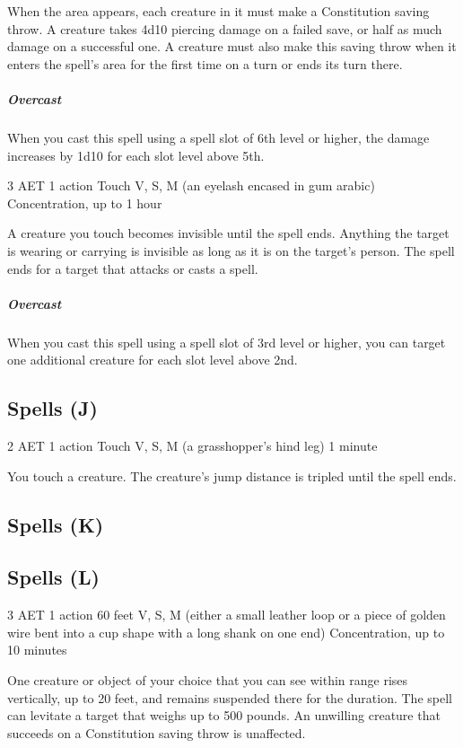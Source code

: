 When the area appears, each creature in it must make a Constitution saving throw. A creature takes 4d10 piercing damage on a failed save, or half as much damage on a successful one. A creature must also make this saving throw when it enters the spell's area for the first time on a turn or ends its turn there.
\subparagraph*{Overcast} When you cast this spell using a spell slot of 6th level or higher, the damage increases by 1d10 for each slot level above 5th.

\label{spell:invisibility}
{3 AET}
{1 action}
{Touch}
{V, S, M (an eyelash encased in gum arabic)}
{Concentration, up to 1 hour}

A creature you touch becomes invisible until the spell ends. Anything the target is wearing or carrying is invisible as long as it is on the target's person. The spell ends for a target that attacks or casts a spell.
\subparagraph*{Overcast} When you cast this spell using a spell slot of 3rd level or higher, you can target one additional creature for each slot level above 2nd.

\subsection{Spells (J)}

\label{spell:jump}
{2 AET}
{1 action}
{Touch}
{V, S, M (a grasshopper's hind leg)}
{1 minute}

You touch a creature. The creature's jump distance is tripled until the spell ends.

\subsection{Spells (K)}

\subsection{Spells (L)}

\label{spell:levitate}
{3 AET}
{1 action}
{60 feet}
{V, S, M (either a small leather loop or a piece of golden wire bent into a cup shape with a long shank on one end)}
{Concentration, up to 10 minutes}

One creature or object of your choice that you can see within range rises vertically, up to 20 feet, and remains suspended there for the duration. The spell can levitate a target that weighs up to 500 pounds. An unwilling creature that succeeds on a Constitution saving throw is unaffected.

